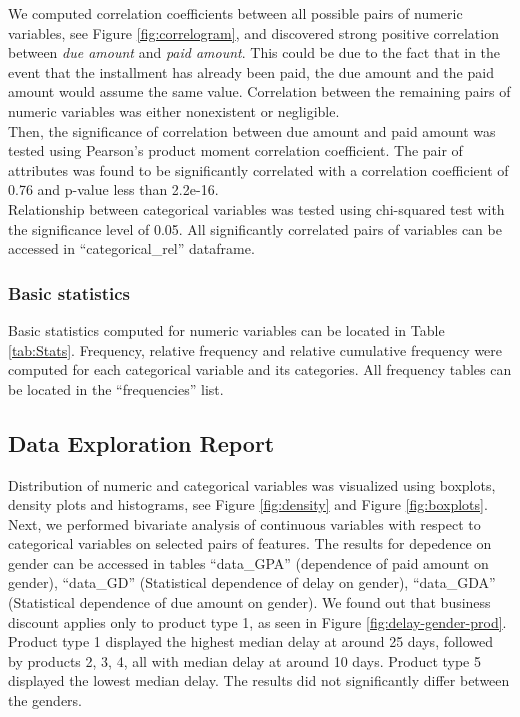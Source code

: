 \documentclass[
]{article}
\begin{document}
We computed correlation coefficients between all possible pairs of numeric variables, see Figure \ref{fig:correlogram}, and discovered strong positive correlation between \emph{due amount} and \emph{paid amount}. This could be due to the fact that in the event that the installment has already been paid, the due amount and the paid amount would assume the same value. Correlation between the remaining pairs of numeric variables was either nonexistent or negligible.\\
Then, the significance of correlation between due amount and paid amount was tested using Pearson's product moment correlation coefficient. The pair of attributes was found to be significantly correlated with a correlation coefficient of 0.76 and p-value less than 2.2e-16.\\
Relationship between categorical variables was tested using chi-squared test with the significance level of 0.05. All significantly correlated pairs of variables can be accessed in ``categorical\_rel'' dataframe.

\hypertarget{basic-statistics}{%
\subsubsection{Basic statistics}\label{basic-statistics}}

Basic statistics computed for numeric variables can be located in Table \ref{tab:Stats}. Frequency, relative frequency and relative cumulative frequency were computed for each categorical variable and its categories. All frequency tables can be located in the ``frequencies'' list.

\hypertarget{data-exploration-report}{%
\subsection{Data Exploration Report}\label{data-exploration-report}}

Distribution of numeric and categorical variables was visualized using boxplots, density plots and histograms, see Figure \ref{fig:density} and Figure \ref{fig:boxplots}. Next, we performed bivariate analysis of continuous variables with respect to categorical variables on selected pairs of features. The results for depedence on gender can be accessed in tables ``data\_GPA'' (dependence of paid amount on gender), ``data\_GD'' (Statistical dependence of delay on gender), ``data\_GDA'' (Statistical dependence of due amount on gender). We found out that business discount applies only to product type 1, as seen in Figure \ref{fig:delay-gender-prod}. Product type 1 displayed the highest median delay at around 25 days, followed by products 2, 3, 4, all with median delay at around 10 days. Product type 5 displayed the lowest median delay. The results did not significantly differ between the genders.
\end{document}
